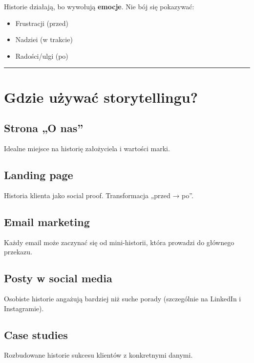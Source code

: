 \documentclass[
  12pt,
  a4paper,
  twoside,
  openright,
  12pt,
  DIV=12,
  BCOR=12mm]{scrbook}
\providecommand{\tightlist}{%
  \setlength{\itemsep}{0pt}\setlength{\parskip}{0pt}}\usepackage{longtable,booktabs,array}
\newcommand{\decoline}{%
  \begin{center}
    \textcolor{bordergray}{\rule{0.3\textwidth}{0.5pt}}
  \end{center}
}
\begin{document}
Historie działają, bo wywołują \textbf{emocje}. Nie bój się pokazywać:

\begin{itemize}
\tightlist
\item
  Frustracji (przed)
\item
  Nadziei (w trakcie)
\item
  Radości/ulgi (po)
\end{itemize}

\decoline

\section{Gdzie używać
storytellingu?}\label{gdzie-uux17cywaux107-storytellingu}

\subsection{Strona „O nas''}\label{strona-o-nas}

Idealne miejsce na historię założyciela i wartości marki.

\subsection{Landing page}\label{landing-page-2}

Historia klienta jako social proof. Transformacja „przed → po''.

\subsection{Email marketing}\label{email-marketing-2}

Każdy email może zaczynać się od mini-historii, która prowadzi do
głównego przekazu.

\subsection{Posty w social media}\label{posty-w-social-media-1}

Osobiste historie angażują bardziej niż suche porady (szczególnie na
LinkedIn i Instagramie).

\subsection{Case studies}\label{case-studies}

Rozbudowane historie sukcesu klientów z konkretnymi danymi.
\end{document}
